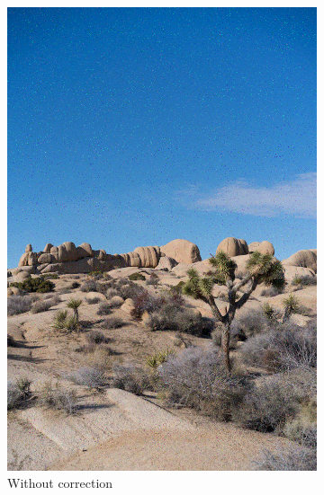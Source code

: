 \documentclass{article}
\begin{document}
\begin{figure}[htb]
\begin{subfigure}[b]{0.32\textwidth}
        \includegraphics[width=\textwidth]{../Result/Cyclic/15-5/cyclic-bsc-output.png}
        \caption{Without correction}
        \label{fig:image-cyclic-15-5-no-correction}
    \end{subfigure}
    \hfill
    \begin{subfigure}[b]{0.32\textwidth}
        \centering

\end{subfigure}
\end{figure}
\end{document}
